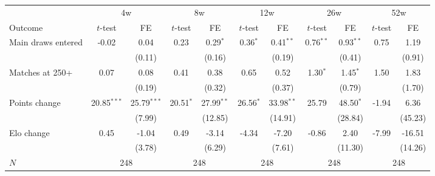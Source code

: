 \begin{tabular}{l cc cc cc cc cc}
\toprule
 & \multicolumn{2}{c}{4w} & \multicolumn{2}{c}{8w} & \multicolumn{2}{c}{12w} & \multicolumn{2}{c}{26w} & \multicolumn{2}{c}{52w} \\
\cmidrule(lr){2-3} \cmidrule(lr){4-5} \cmidrule(lr){6-7} \cmidrule(lr){8-9} \cmidrule(lr){10-11}
Outcome & $t$-test & FE & $t$-test & FE & $t$-test & FE & $t$-test & FE & $t$-test & FE \\
\midrule
Main draws entered & -0.02 & 0.04 & 0.23 & 0.29$^{*}$ & 0.36$^{*}$ & 0.41$^{**}$ & 0.76$^{**}$ & 0.93$^{**}$ & 0.75 & 1.19 \\
 & & (0.11) & & (0.16) & & (0.19) & & (0.41) & & (0.91) \\
\addlinespace
Matches at 250+ & 0.07 & 0.08 & 0.41 & 0.38 & 0.65 & 0.52 & 1.30$^{*}$ & 1.45$^{*}$ & 1.50 & 1.83 \\
 & & (0.19) & & (0.32) & & (0.37) & & (0.79) & & (1.70) \\
\addlinespace
Points change & 20.85$^{***}$ & 25.79$^{***}$ & 20.51$^{*}$ & 27.99$^{**}$ & 26.56$^{*}$ & 33.98$^{**}$ & 25.79 & 48.50$^{*}$ & -1.94 & 6.36 \\
 & & (7.99) & & (12.85) & & (14.91) & & (28.84) & & (45.23) \\
\addlinespace
Elo change & 0.45 & -1.04 & 0.49 & -3.14 & -4.34 & -7.20 & -0.86 & 2.40 & -7.99 & -16.51 \\
 & & (3.78) & & (6.29) & & (7.61) & & (11.30) & & (14.26) \\
\addlinespace
$N$ & \multicolumn{2}{c}{248} & \multicolumn{2}{c}{248} & \multicolumn{2}{c}{248} & \multicolumn{2}{c}{248} & \multicolumn{2}{c}{248} \\
\bottomrule
\end{tabular}
